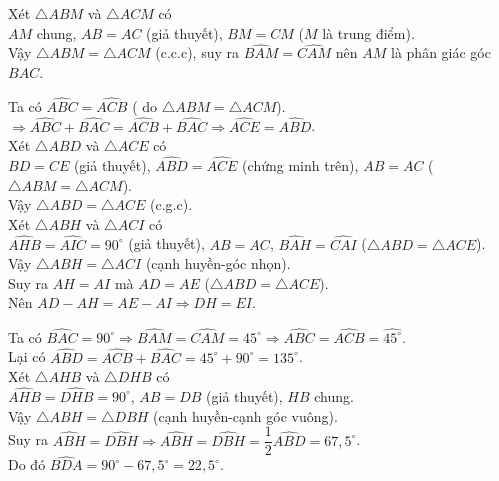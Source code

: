 \begin{ex}
{\begin{enumEX}{1}
				\item Xét $\triangle ABM$ và $\triangle ACM$ có 
				\\ $AM$ chung, $AB=AC$ (giả thuyết), $BM=CM$ ($M$ là trung điểm).
				\\ Vậy $\triangle ABM = \triangle ACM$ (c.c.c), suy ra $\widehat{BAM}=\widehat{CAM}$ nên $AM$ là phân giác góc $BAC$.
				\item Ta có $\widehat{ABC}=\widehat{ACB}$ ( do $\triangle ABM = \triangle ACM$).
				\\ $\Rightarrow \widehat{ABC}+\widehat{BAC}=\widehat{ACB}+\widehat{BAC}\Rightarrow \widehat{ACE}=\widehat{ABD}$.
				\\ Xét $\triangle ABD$ và $\triangle ACE$ có
				\\ $BD=CE$ (giả thuyết), $\widehat{ABD}=\widehat{ACE}$ (chứng minh trên), $AB=AC$ ($\triangle ABM = \triangle ACM$).
				\\ Vậy  $\triangle ABD = \triangle ACE$ (c.g.c).
				\\ Xét $\triangle ABH$ và $\triangle ACI$ có
				\\ $\widehat{AHB}=\widehat{AIC}=90^\circ$ (giả thuyết), $AB=AC$, $\widehat{BAH}=\widehat{CAI}$ ($\triangle ABD = \triangle ACE$).
				\\ Vậy $\triangle ABH = \triangle ACI$ (cạnh huyền-góc nhọn).
				\\ Suy ra $AH=AI$ mà $AD=AE$ ($\triangle ABD = \triangle ACE$).
				\\ Nên $AD-AH=AE-AI\Rightarrow DH=EI$.
				\item Ta có $\widehat{BAC}=90^\circ \Rightarrow \widehat{BAM}=\widehat{CAM}=45^\circ \Rightarrow \widehat{ABC}=\widehat{ACB}=\widehat{45^\circ}$.
				\\ Lại có $\widehat{ABD}=\widehat{ACB}+\widehat{BAC}=45^\circ+90^\circ=135^\circ$.
				\\ Xét $\triangle AHB$ và $\triangle DHB$ có
				\\ $\widehat{AHB}=\widehat{DHB}=90^\circ$, $AB=DB$ (giả thuyết), $HB$ chung.
				\\ Vậy $\triangle ABH= \triangle DBH$ (cạnh huyền-cạnh góc vuông).
				\\ Suy ra $\widehat{ABH}=\widehat{DBH}\Rightarrow \widehat{ABH}=\widehat{DBH}=\dfrac{1}{2}\widehat{ABD}=67,5^\circ$.
				\\ Do đó $\widehat{BDA}=90^\circ-67,5^\circ=22,5^\circ.$
			\end{enumEX}
			
		}
	\end{ex}
	
